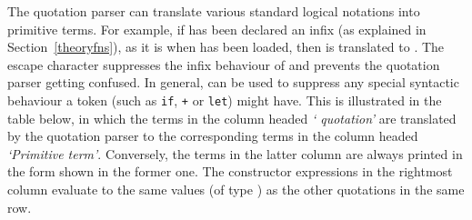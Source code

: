 The \HOL{} quotation parser
%
%
can translate various standard logical
notations
%
%
into primitive terms. For example, if \ml{+} has been declared an
infix
%
%
(as explained in Section~\ref{theoryfns}), as it is when
 has been loaded, then  is
translated to . The escape character \ml{\$}
%
%
%
%
%
suppresses the infix behaviour of \ml{+} and prevents the quotation
parser getting confused.  In general, \ml{\$} can be used to suppress
any special syntactic behaviour a token (such as \texttt{if},
\texttt{+} or \texttt{let})
%
%
might have. This is illustrated in the table below, in which the terms
in the column headed \textit{`\ML{} quotation'} are translated by the
quotation parser to the corresponding terms in the column headed
\textit{`Primitive term'}.  Conversely, the terms in the latter column
are always printed in the form shown in the former one.  The \ML{}
constructor expressions in the rightmost column evaluate to the same
values (of type ) as the other quotations in the same row.

\bigskip

